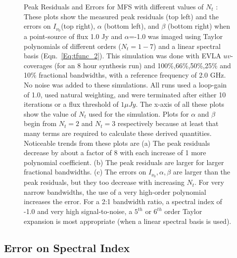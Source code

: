 \documentclass[structabstract]{stylefiles/aa}
\begin{document}
\begin{figure}
\begin{center}
\end{center}
\caption[Peak Residuals and Errors for MFS with different values of $N_t$]
{\small Peak Residuals and Errors for MFS with different values of $N_t$ :
These plots show the measured peak residuals (top left) and the errors
on $I_{\nu_0}$(top right), $\alpha$ (bottom left), and $\beta$ (bottom right)
when a point-source
of flux 1.0 Jy and $\alpha$=-1.0 was imaged using Taylor polynomials of different
orders ($N_t=1-7$) and a linear spectral basis (Eqn.~\ref{Eq:tfunc_2}). 
This simulation was done with EVLA $uv$-coverages
(for an 8 hour synthesis run) and 100\%,66\%,50\%,25\% and 10\% fractional 
bandwidths, with a reference frequency of 2.0 GHz. No noise was added to 
these simulations. All runs used a loop-gain of 1.0, used natural weighting,
and were terminated after either 10 iterations or a flux threshold of $1\mu Jy$.
The x-axis of all these plots show the value of $N_t$ used for the simulation.
Plots for $\alpha$ and $\beta$ begin from $N_t=2$ and $N_t=3$ respectively
because at least that many terms are required to calculate these derived
quantities.
Noticeable trends from these plots are
(a) The peak residuals decrease by about a factor of 8 with each increase
of 1 more polynomial coefficient. (b) The peak residuals are larger for 
larger fractional bandwidths. (c) The errors on $I_{\nu_0},\alpha,\beta$
are larger than the peak residuals, but they too decrease with increasing
$N_t$. For very narrow bandwidths, the use of a very high-order polynomial
increases the error.
For a 2:1 bandwidth ratio, a spectral index of -1.0 and very 
high signal-to-noise, a $5^{th}$ or $6^{th}$ order Taylor expansion
is most appropriate (when a linear spectral basis is used).
}
\label{Fig:taylor_error}
\end{figure}


\subsection{Error on Spectral Index}
\end{document}
